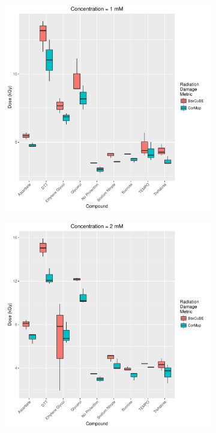 \begin{figure}
    \centering
    \begin{subfigure}[b]{0.45\textwidth}
            \centering
            \includegraphics[width=\textwidth]{figures/saxs/Conc_1_dose.pdf}
            \caption{}
            \label{fig:SAXS Metric comparison - 1mM}
    \end{subfigure}
    \qquad
    \begin{subfigure}[b]{0.45\textwidth}
            \centering
            \includegraphics[width=\textwidth]{figures/saxs/Conc_2_dose.pdf}

\end{subfigure}
\end{figure}
